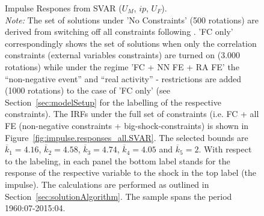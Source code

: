 \documentclass[a4paper,11pt,listof=nochaptergap,oneside,pointednumbers,bibtotoc,bigheadings,liststotoc,hidelinks]{scrbook}
\theoremstyle{mysatz}
\theoremstyle{mydefinition}
\theoremstyle{mytheorem}
\theoremstyle{mybemerkung}
\begin{document}
\begin{figure}[!h]
   \centering
   \setlength\fboxsep{0pt}
   \setlength\fboxrule{0pt}
      \caption[Impulse Respones from SVAR ($U_{M}$, $ip$, $U_{F}$).]{Impulse Respones from SVAR ($U_{M}$, $ip$, $U_{F}$).\\
      \textit{Note:} The set of solutions under 'No Constraints' (500 rotations) are derived from switching off all constraints following  \citet{ludvigsonetal:19}. 'FC only' correspondingly shows the set of solutions when only the correlation constraints (external variables constraints) are turned on (3.000 rotations) while under the regime 'FC + NN FE + RA FE' the ``non-negative event'' and ``real activity'' - restrictions are added (1000 rotations) to the case of 'FC only' (see Section~\ref{sec:modelSetup} for the labelling of the respective constraints). The IRFs under the full set of constraints (i.e. FC + all FE (non-negative constraints + big-shock-constraints) is shown in Figure~\ref{fig:impulse.responses_all.SVAR}. The selected bounds are $\overline{k}_1 = 4.16$, $\overline{k}_2 = 4.58$, $\overline{k}_3 = 4.74$, $\overline{k}_4 = 4.05$ and $\overline{k}_5 = 2$. With respect to the labeling, in each panel the bottom label stands for the response of the respective variable to the shock in the top label (the impulse). The calculations are performed as outlined in Section~\ref{sec:solutionAlgorithm}. The sample spans the period 1960:07-2015:04.}   \label{fig:impulse.responses_all.SVAR_UNCONSTR}
\end{figure}
\end{document}
